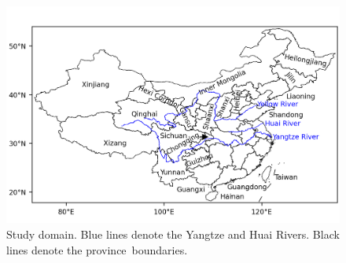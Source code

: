 \documentclass[atmosphere,article,accept,pdftex,moreauthors]{Definitions/mdpi}
\begin{document}
\begin{figure}[H]
  \includegraphics[width=13.8cm]{fig/map.png}
  \caption{Study domain. Blue lines denote the Yangtze and Huai Rivers. Black lines denote the province~boundaries.\label{fig:chinamap}}
\end{figure}
\unskip
\end{document}

